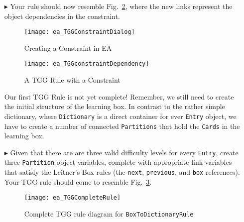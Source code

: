 \begin{enumerate}
\item[$\blacktriangleright$] Your rule should now resemble Fig.~\ref{fig:tgg_rule_with_constraint}, where the new links represent the object dependencies in the
constraint.

\newpage

\begin{figure}[htbp]
\begin{center}
  \texttt{[image: ea\_TGGConstraintDialog]}
  \caption{Creating a Constraint in EA}
  \label{fig:first_tgg_constraint}
\end{center}
\end{figure}

\vspace{1cm}

\begin{figure}[h!]
\begin{center}
  \texttt{[image: ea\_TGGconstraintDependency]}
  \caption{A TGG Rule with a Constraint}
  \label{fig:tgg_rule_with_constraint}
  \end{center}
\end{figure}

\newpage

Our first TGG Rule is not yet complete! Remember, we still need to create the initial structure of the learning box. In contrast to the rather
simple dictionary, where \texttt{Dictionary} is a direct container for ever \texttt{Entry} object, we have to create a number of connected \texttt{Partitions}
that hold the \texttt{Cards} in the learning box. 

\item[$\blacktriangleright$] Given that there are are three valid difficulty levels for every \texttt{Entry}, create three \texttt{Partition} object variables,
complete with appropriate link variables that satisfy the Leitner's Box rules (the \texttt{next}, \texttt{previous}, and \texttt{box} references). Your TGG rule
should come to resemble Fig.~\ref{fig:boxtodictionaryrule_complete}.


\begin{figure}[htbp]
\begin{center}
  \texttt{[image: ea\_TGGCompleteRule]}
  \caption{Complete TGG rule diagram for \texttt{BoxToDictionaryRule}}
  \label{fig:boxtodictionaryrule_complete}
\end{center}
\end{figure}

\end{enumerate}


